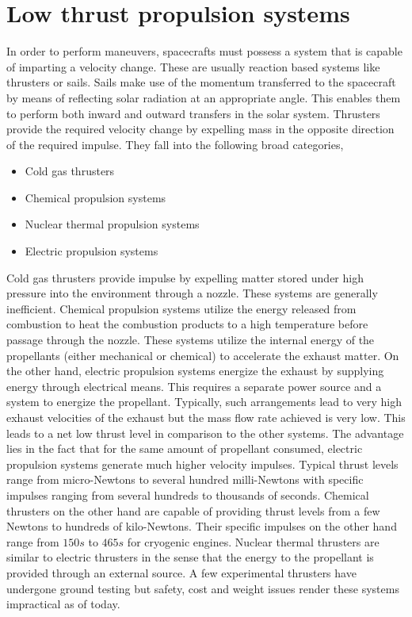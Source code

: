 \section{Low thrust propulsion systems} %

In order to perform maneuvers, spacecrafts must possess a system that is capable of imparting a velocity change. These are usually reaction based systems like thrusters or sails. Sails make use of the momentum transferred to the spacecraft by means of reflecting solar radiation at an appropriate angle. This enables them to perform both inward and outward transfers in the solar system. Thrusters provide the required velocity change by expelling mass in the opposite direction of the required impulse. They fall into the following broad categories,
\begin{itemize}
	\item Cold gas thrusters
	\item Chemical propulsion systems
	\item Nuclear thermal propulsion systems
	\item Electric propulsion systems
\end{itemize}
Cold gas thrusters provide impulse by expelling matter stored under high pressure into the environment through a nozzle. These systems are generally inefficient. Chemical propulsion systems utilize the energy released from combustion to heat the combustion products to a high temperature before passage through the nozzle. These systems utilize the internal energy of the propellants (either mechanical or chemical) to accelerate the exhaust matter. On the other hand, electric propulsion systems energize the exhaust by supplying energy through electrical means. This requires a separate power source and a system to energize the propellant. Typically, such arrangements lead to very high exhaust velocities of the exhaust but the mass flow rate achieved is very low. This leads to a net low thrust level in comparison to the other systems. The advantage lies in the fact that for the same amount of propellant consumed, electric propulsion systems generate much higher velocity impulses. Typical thrust levels range from micro-Newtons to several hundred milli-Newtons with specific impulses ranging from several hundreds to thousands of seconds. Chemical thrusters on the other hand are capable of providing thrust levels from a few Newtons to hundreds of kilo-Newtons. Their specific impulses on the other hand range from $150s$ to $465s$ for cryogenic engines. Nuclear thermal thrusters are similar to electric thrusters in the sense that the energy to the propellant is provided through an external source. A few experimental thrusters have undergone ground testing but safety, cost and weight issues render these systems impractical as of today.

